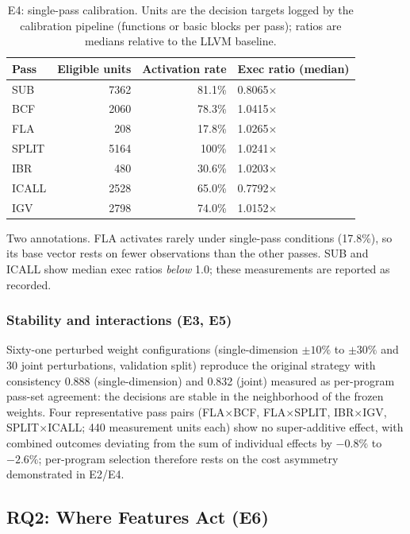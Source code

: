 \documentclass[5p,times,authoryear]{elsarticle}
\theoremstyle{plain}
\theoremstyle{definition}
\theoremstyle{remark}
\begin{document}
\begin{table}[!t]
\centering
\footnotesize
\caption{E4: single-pass calibration. Units are the decision targets logged by the
calibration pipeline (functions or basic blocks per pass); ratios are medians relative
to the LLVM baseline.}
\label{tab:e4_perpass}
\begin{tabular}{lrrl}
\toprule
Pass & Eligible units & Activation rate & Exec ratio (median) \\
\midrule
SUB & 7362 & 81.1\% & 0.8065$\times$ \\
BCF & 2060 & 78.3\% & 1.0415$\times$ \\
FLA & 208 & 17.8\% & 1.0265$\times$ \\
SPLIT & 5164 & 100\% & 1.0241$\times$ \\
IBR & 480 & 30.6\% & 1.0203$\times$ \\
ICALL & 2528 & 65.0\% & 0.7792$\times$ \\
IGV & 2798 & 74.0\% & 1.0152$\times$ \\
\bottomrule
\end{tabular}
\end{table}

Two annotations. FLA activates rarely under single-pass conditions (17.8\%), so
its base vector rests on fewer observations than the other passes. SUB and
ICALL show median exec ratios \emph{below} 1.0; these measurements are
reported as recorded.

\subsubsection{Stability and interactions (E3, E5)}
Sixty-one perturbed weight configurations (single-dimension $\pm10\%$ to $\pm30\%$ and
30 joint perturbations, validation split) reproduce the original strategy with
consistency 0.888 (single-dimension) and 0.832 (joint) measured as per-program
pass-set agreement: the decisions are stable in the neighborhood of the frozen
weights. Four representative pass pairs
(FLA$\times$BCF, FLA$\times$SPLIT, IBR$\times$IGV, SPLIT$\times$ICALL; 440
measurement units each) show no super-additive effect, with combined outcomes
deviating from the sum of individual effects by $-0.8\%$ to $-2.6\%$; per-program
selection therefore rests on the cost asymmetry demonstrated in E2/E4.

\subsection{RQ2: Where Features Act (E6)}
\label{sec:e6}
\end{document}
